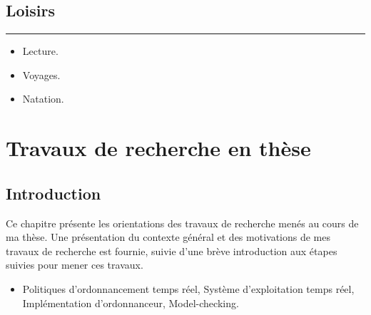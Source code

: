 \section{Loisirs}
\vspace{-0.6cm}
\hspace{0.7cm}\textcolor{myblue}{\rule{15cm}{1mm}}

\vspace{0.2cm}
\begin{itemize}
	\item Lecture.
	\item Voyages.
	\item Natation.
\end{itemize}



\let\cleardoublepage\clearpage
\chapter{Travaux de recherche en thèse}


\section{Introduction}

Ce chapitre présente les orientations des travaux de recherche menés au cours de ma thèse. Une présentation du contexte général et des motivations de mes travaux de recherche est fournie, suivie d'une brève introduction aux étapes suivies pour mener ces travaux.

\vspace{1cm}
\begin{minipage}{0.1\textwidth}
	\hspace{0.15cm}
\end{minipage}
\begin{minipage}{0.85\textwidth}
	
\begin{itemize}[label=\textbf{Mots clés :}] \item Politiques d’ordonnancement temps réel, Système d’exploitation temps réel, Implémentation d'ordonnanceur, Model-checking.
	
	
\end{itemize}

\end{minipage}


